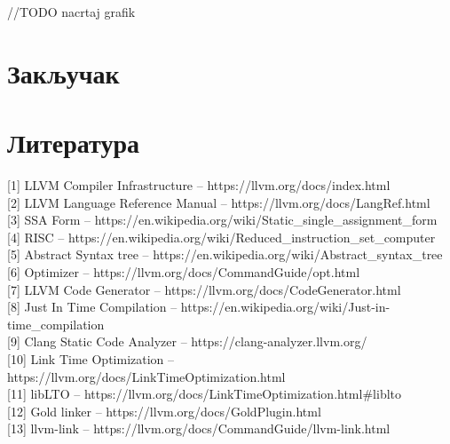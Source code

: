 \documentclass[12pt,oneside]{memoir}
\begin{document}
//TODO nacrtaj grafik


\chapter{Закључак}



\backmatter
\chapter{Литература}
[1] LLVM Compiler Infrastructure -- https://llvm.org/docs/index.html \\

[2] LLVM Language Reference Manual -- https://llvm.org/docs/LangRef.html \\

[3] SSA Form -- https://en.wikipedia.org/wiki/Static{\_}single{\_}assignment{\_}form \\
 
[4] RISC -- https://en.wikipedia.org/wiki/Reduced{\_}instruction{\_}set{\_}computer \\

[5] Abstract Syntax tree -- https://en.wikipedia.org/wiki/Abstract{\_}syntax{\_}tree \\

[6] Optimizer -- https://llvm.org/docs/CommandGuide/opt.html \\

[7] LLVM Code Generator -- https://llvm.org/docs/CodeGenerator.html \\

[8] Just In Time Compilation  -- https://en.wikipedia.org/wiki/Just-in-time{\_}compilation \\

[9] Clang Static Code Analyzer  -- https://clang-analyzer.llvm.org/ \\ 

[10] Link Time Optimization -- https://llvm.org/docs/LinkTimeOptimization.html \\

[11] libLTO -- https://llvm.org/docs/LinkTimeOptimization.html{\#}liblto \\

[12] Gold linker -- https://llvm.org/docs/GoldPlugin.html \\

[13] llvm-link -- https://llvm.org/docs/CommandGuide/llvm-link.html
\end{document}
